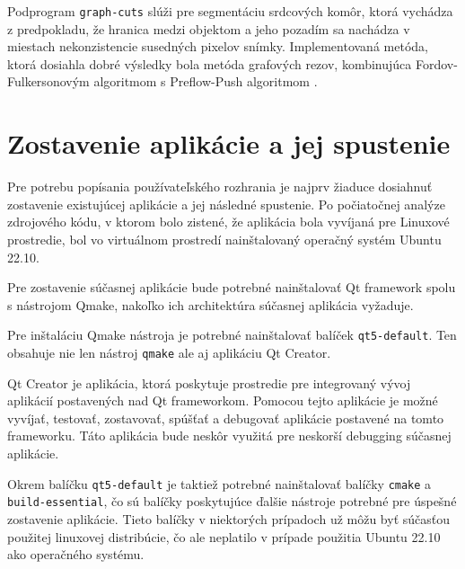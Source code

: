 Podprogram \texttt{graph-cuts} slúži pre segmentáciu srdcových komôr, ktorá vychádza z predpokladu, že hranica medzi objektom a jeho pozadím sa nachádza v miestach nekonzistencie susedných pixelov snímky. Implementovaná metóda, ktorá dosiahla dobré výsledky bola metóda grafových rezov, kombinujúca Fordov-Fulkersonovým algoritmom s Preflow-Push algoritmom \cite{master_thesis_app}.

\section {Zostavenie aplikácie a jej spustenie}

Pre potrebu popísania používateľského rozhrania je najprv žiaduce dosiahnuť zostavenie existujúcej aplikácie a jej následné spustenie. Po počiatočnej analýze zdrojového kódu, v ktorom bolo zistené, že aplikácia bola vyvíjaná pre Linuxové prostredie, bol vo virtuálnom prostredí nainštalovaný operačný systém Ubuntu 22.10.

Pre zostavenie súčasnej aplikácie bude potrebné nainštalovať Qt framework spolu s nástrojom Qmake, nakoľko ich architektúra súčasnej aplikácia vyžaduje.

Pre inštaláciu Qmake nástroja je potrebné nainštalovať balíček \texttt{qt5-default}. Ten obsahuje nie len nástroj \texttt{qmake} ale aj aplikáciu Qt Creator.

Qt Creator je aplikácia, ktorá poskytuje prostredie pre integrovaný vývoj aplikácií postavených nad Qt frameworkom. Pomocou tejto aplikácie je možné vyvíjať, testovať, zostavovať, spúšťať a debugovať aplikácie postavené na tomto frameworku. Táto aplikácia bude neskôr využitá pre neskorší debugging súčasnej aplikácie.

Okrem balíčku \texttt{qt5-default} je taktiež potrebné nainštalovať balíčky \texttt{cmake} a \texttt{build-essential}, čo sú balíčky poskytujúce ďalšie nástroje potrebné pre úspešné zostavenie aplikácie. Tieto balíčky v niektorých prípadoch už môžu byť súčasťou použitej linuxovej distribúcie, čo ale neplatilo v prípade použitia Ubuntu 22.10 ako operačného systému.

